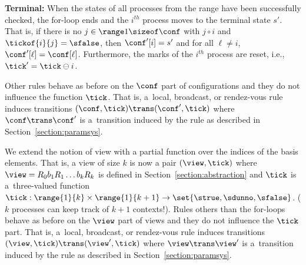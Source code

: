 \noindent\begin{minipage}[!t]{0.7\linewidth}%
  {\bf Terminal:} When the states of all processes from the range have
  been successfully checked, the for-loop ends and the $i^{th}$
  process moves to the terminal state $s'$. %
  That is, if there is no $j\in\range 1 {\sizeof \conf}$ with $j\circ
  i$ and $\tickof{i}{j}=\sfalse$, then $\conf' [i] = s'$ and for all
  $\ell\neq i$, $\conf' [\ell] = \conf [\ell]$. %
  Furthermore, the marks of the $i^{th}$ process are reset, i.e.,
  $\tick' = \tick\ominus i$.
\end{minipage}
\hfill%
\begin{minipage}[!t]{0.29\linewidth}%
\end{minipage}

Other rules behave as before on the $\conf$ part of configurations and
they do not influence the function $\tick$.  That is, a~local,
broadcast, or rendez-vous rule%
%
induces transitions $(\conf,\tick) \trans (\conf',\tick)$ where
$\conf\trans \conf'$ is a~transition induced by the rule as described
in Section~\ref{section:paramsys}.


We extend the notion of view with a partial function over the indices
of the basis elements. That is, a view of size $k$ is now a pair
$(\view,\tick)$ where $\view = R_0b_1R_1\ldots b_kR_k$ is defined in
Section~\ref{section:abstraction} and $\tick$ is a~three-valued
function
$\tick:\range{1}{k}\times\range{1}{k+1}\rightarrow\set{\strue,\sdunno,\sfalse}$.
($k$ processes can keep track of $k+1$ contexts!).
%
%
Rules others than the for-loops behave as before on the $\view$ part
of views and they do not influence the $\tick$ part. %
That is, a~local, broadcast, or rendez-vous rule induces
transitions $(\view,\tick) \trans (\view',\tick)$ where $\view\trans
\view'$ is a~transition induced by the rule as described in
Section~\ref{section:paramsys}.

